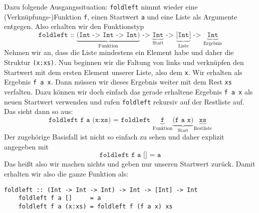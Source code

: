 \documentclass[ngerman, a4paper, 11pt]{article}
\theoremstyle{nonumberplain}
\begin{document}
Dazu folgende Ausgangssituation: \texttt{foldleft} nimmt wieder eine (Verknüpfungs-)Funktion \texttt{f}, einen Startwert \texttt{a} und eine Liste als Argumente entgegen. Also erhalten wir den Funktionstyp
\begin{equation*}
	\texttt{foldleft :: } \underbrace{\texttt{(Int -> Int -> Int)}}_{\text{Funktion}} \texttt{ -> } \underbrace{\texttt{Int}}_{\text{Start}} \texttt{ -> } \underbrace{\texttt{[Int]}}_{\text{Liste}} \texttt{ -> } \underbrace{\texttt{Int}}_{\text{Ergebnis}}
\end{equation*}
Nehmen wir an, dass die Liste mindestens ein Element habe und daher die Struktur \texttt{(x:xs)}.
Nun beginnen wir die Faltung von links und verknüpfen den Startwert mit dem ersten Element unserer Liste, also dem \texttt{x}. Wir erhalten als Ergebnis \texttt{f a x}. Dann müssen wir dieses Ergebnis weiter mit dem Rest \texttt{xs} verfalten. Dazu können wir doch einfach das gerade erhaltene Ergebnis \texttt{f a x} als neuen Startwert verwenden und rufen \texttt{foldleft} rekursiv auf der Restliste auf. Das sieht dann so aus:
\begin{equation*}
	\texttt{foldleft f a (x:xs) = foldleft } \underbrace{\texttt{f}}_{\text{Funktion}} \underbrace{\texttt{(f a x)}}_{\text{Start}} \underbrace{\texttt{xs}}_{\text{Restliste}}
\end{equation*}
Der zugehörige Basisfall ist nicht so einfach zu sehen und daher explizit angegeben mit 
\begin{equation*}
	\texttt{foldleft f a [] = a}
\end{equation*}
Das heißt also wir machen nichts und geben nur unseren Startwert zurück.
Damit erhalten wir also die ganze Funktion als:

\begin{lstlisting}[style=frame]
	foldleft :: (Int -> Int -> Int) -> Int -> [Int] -> Int
	foldleft f a []     = a
	foldleft f a (x:xs) = foldleft f (f a x) xs
\end{lstlisting}
\end{document}
